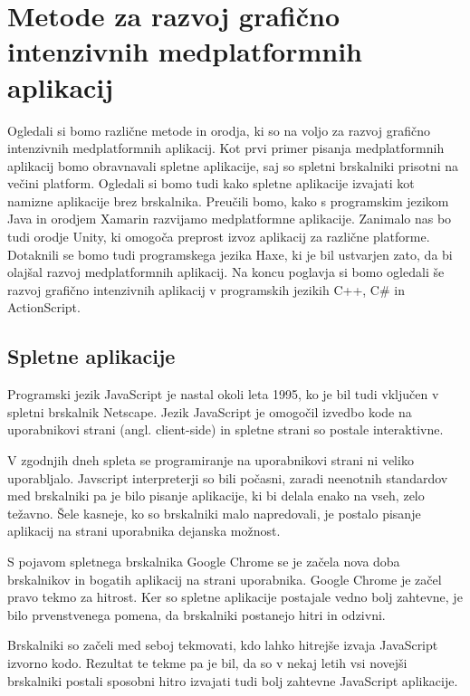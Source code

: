 \chapter{Metode za razvoj grafično intenzivnih medplatformnih aplikacij}

Ogledali si bomo različne metode in orodja, ki so na voljo za razvoj grafično intenzivnih medplatformnih aplikacij. Kot prvi primer pisanja medplatformnih aplikacij bomo obravnavali spletne aplikacije, saj so spletni brskalniki prisotni na večini platform. Ogledali si bomo tudi kako spletne aplikacije izvajati kot namizne aplikacije brez brskalnika. Preučili bomo, kako s programskim jezikom Java in orodjem Xamarin razvijamo medplatformne aplikacije. Zanimalo nas bo tudi orodje Unity, ki omogoča preprost izvoz aplikacij za različne platforme. Dotaknili se bomo tudi programskega jezika Haxe, ki je bil ustvarjen zato, da bi olajšal razvoj medplatformnih aplikacij. Na koncu poglavja si bomo ogledali še razvoj grafično intenzivnih aplikacij v programskih jezikih C++, C\# in ActionScript.

\section{Spletne aplikacije}
\label{sec:web}
Programski jezik JavaScript je nastal okoli leta 1995, ko je bil tudi vključen v spletni brskalnik Netscape. Jezik JavaScript je omogočil izvedbo kode na uporabnikovi strani (angl. client-side) in spletne strani so postale interaktivne.

V zgodnjih dneh spleta se programiranje na uporabnikovi strani ni veliko uporabljalo. Javscript interpreterji so bili počasni, zaradi neenotnih standardov med brskalniki pa je bilo pisanje aplikacije, ki bi delala enako na vseh, zelo težavno. Šele kasneje, ko so brskalniki malo napredovali, je postalo pisanje aplikacij na strani uporabnika dejanska možnost.

S pojavom spletnega brskalnika Google Chrome se je začela nova doba brskalnikov in bogatih aplikacij na strani uporabnika. Google Chrome je začel pravo tekmo za hitrost. Ker so spletne aplikacije postajale vedno bolj zahtevne, je bilo prvenstvenega pomena, da brskalniki postanejo hitri in odzivni.

Brskalniki so začeli med seboj tekmovati, kdo lahko hitrejše izvaja JavaScript izvorno kodo. Rezultat te tekme pa je bil, da so v nekaj letih vsi novejši brskalniki postali sposobni hitro izvajati tudi bolj zahtevne JavaScript aplikacije. 

